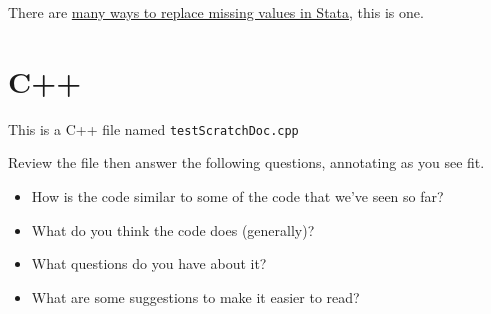 \documentclass[
]{book}
\providecommand{\tightlist}{%
  \setlength{\itemsep}{0pt}\setlength{\parskip}{0pt}}
\begin{document}
There are \href{https://www.stata.com/support/faqs/data-management/replacing-missing-values/}{many ways to replace missing values in Stata}, this is one.

\section{C++}\label{c}

This is a C++ file named \texttt{testScratchDoc.cpp}

Review the file then answer the following questions, annotating as you see fit.

\begin{itemize}
\tightlist
\item
  How is the code similar to some of the code that we've seen so far?
\item
  What do you think the code does (generally)?
\item
  What questions do you have about it?
\item
  What are some suggestions to make it easier to read?
\end{itemize}
\end{document}
